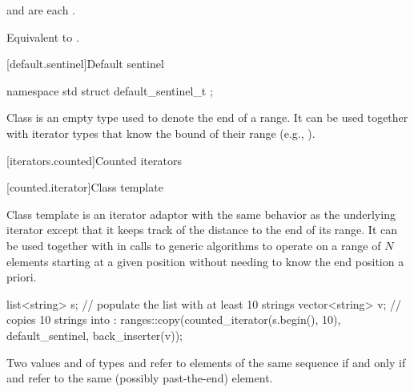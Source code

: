 \begin{itemdescr}
\pnum
\expects
{} and 
are each .

\pnum
\effects
Equivalent to .
\end{itemdescr}

[default.sentinel]{Default sentinel}

%
\begin{itemdecl}
namespace std {
  struct default_sentinel_t { };
}
\end{itemdecl}

\pnum
Class  is an empty type used to denote the end of a
range. It can be used together with iterator types that know the bound
of their range (e.g., ).

[iterators.counted]{Counted iterators}

[counted.iterator]{Class template }

\pnum
Class template  is an iterator adaptor
with the same behavior as the underlying iterator except that
it keeps track of the distance to the end of its range.
It can be used together with 
in calls to generic algorithms to operate on
a range of $N$ elements starting at a given position
without needing to know the end position a priori.

\pnum
\begin{example}
\begin{codeblock}
list<string> s;
// populate the list  with at least 10 strings
vector<string> v;
// copies 10 strings into :
ranges::copy(counted_iterator(s.begin(), 10), default_sentinel, back_inserter(v));
\end{codeblock}
\end{example}

\pnum
Two values  and  of types
and
refer to elements of the same sequence if and only if
and
refer to the same (possibly past-the-end) element.

